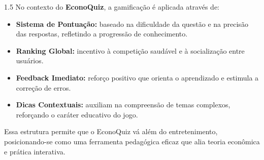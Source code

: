 \documentclass[a4paper, 12pt]{article}
\begin{document}
\begin{spacing}{1.5}
No contexto do \textbf{EconoQuiz}, a gamificação é aplicada através de:
\begin{itemize}
\item \textbf{Sistema de Pontuação:} baseado na dificuldade da questão e na precisão das respostas, refletindo a progressão de conhecimento.
\item \textbf{Ranking Global:} incentivo à competição saudável e à socialização entre usuários.
\item \textbf{Feedback Imediato:} reforço positivo que orienta o aprendizado e estimula a correção de erros.
\item \textbf{Dicas Contextuais:} auxiliam na compreensão de temas complexos, reforçando o caráter educativo do jogo.
\end{itemize}

Essa estrutura permite que o EconoQuiz vá além do entretenimento, posicionando-se como uma ferramenta pedagógica eficaz que alia teoria econômica e prática interativa.


\end{spacing}
\end{document}
